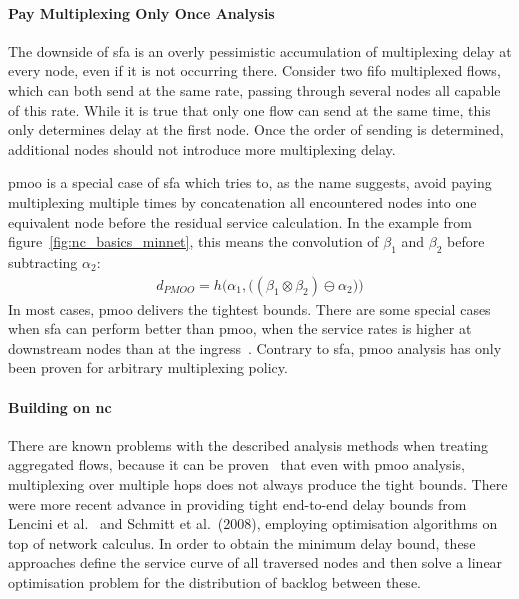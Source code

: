 \paragraph{Pay Multiplexing Only Once Analysis}
The downside of \gls{sfa} is an overly pessimistic accumulation of multiplexing delay at every node, even if it is not occurring there. Consider two \gls{fifo} multiplexed flows, which can both send at the same rate, passing through several nodes
all capable of this rate. While it is true that only one flow can send at the same time, this only determines delay at the first node. Once the order of sending is determined, additional nodes should not introduce more multiplexing delay.
\par
\gls{pmoo} is a special case of \gls{sfa} which tries to, as the name suggests, avoid paying multiplexing multiple times by concatenation all encountered nodes into one equivalent node before the residual service calculation.
In the example from figure~\ref{fig:nc_basics_minnet}, this means the convolution of $\beta_1$ and $\beta_2$ before subtracting $\alpha_2$:
%
\begin{align}
d_{PMOO} = h \Big( \alpha_1, \big( (\beta_1 \otimes \beta_2) \ominus \alpha_2 \big) \Big)
\label{eq:d_pmoo}
\end{align}
%
In most cases, \gls{pmoo} delivers the tightest bounds. There are some special cases when \gls{sfa} can perform better than \gls{pmoo}, when the service rates is higher at downstream nodes than at the ingress~\cite{schmitt_delay_2008}.
Contrary to \gls{sfa}, \gls{pmoo} analysis has only been proven for arbitrary multiplexing policy.

\paragraph{Building on \gls{nc}}
There are known problems with the described analysis methods when treating aggregated flows, because it can be proven~\cite{schmitt_delay_2008} that even with \gls{pmoo} analysis, multiplexing over multiple hops
does not always produce the tight bounds. There were more recent advance in providing tight end-to-end delay bounds from Lencini et al.~\cite{lenzini_end--end_2007} and Schmitt et al.~\cite{schmitt_delay_2008}(2008), employing optimisation algorithms on top of network calculus. In order to obtain the minimum delay bound, these approaches define the service curve of all traversed nodes and then solve a linear optimisation problem for the distribution of backlog between these.

